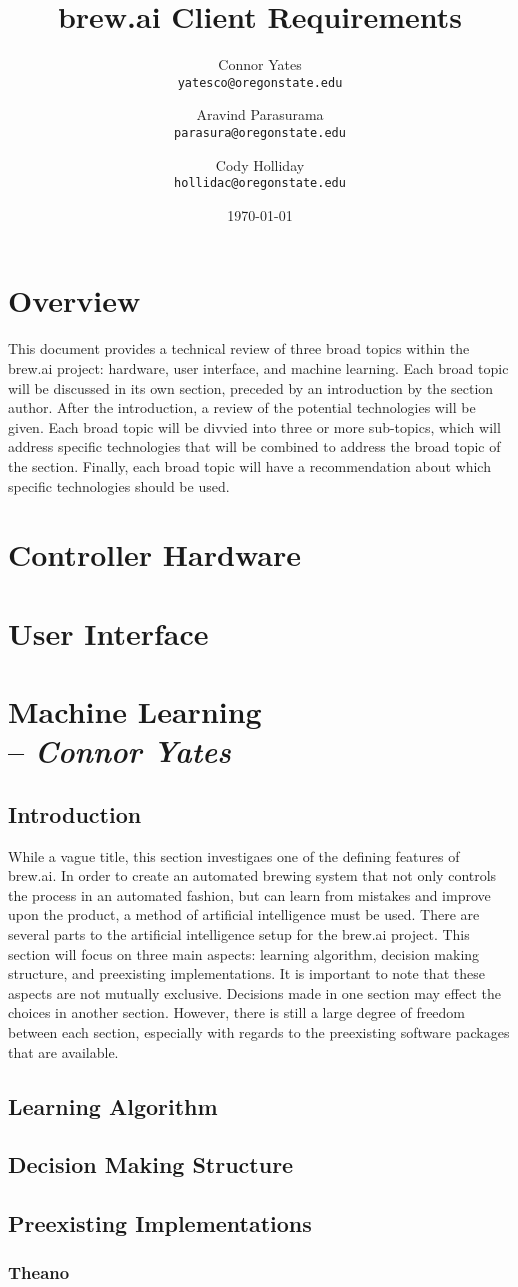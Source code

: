 \documentclass[draftclsnofoot,onecolumn,letterpaper,10pt]{IEEEtran}
\author{Connor Yates\\
\texttt{yatesco@oregonstate.edu\\}
\and
Aravind Parasurama\\
\texttt{parasura@oregonstate.edu\\}
\and
Cody Holliday\\
\texttt{hollidac@oregonstate.edu\\}}
\date{\today}
\title{brew.ai Client Requirements}
\begin{document}
\maketitle

\newpage
\tableofcontents
\newpage
\section{Overview}
This document provides a technical review of three broad topics within the brew.ai project: hardware, user interface, and machine learning.
Each broad topic will be discussed in its own section, preceded by an introduction by the section author.
After the introduction, a review of the potential technologies will be given.
Each broad topic will be divvied into three or more sub-topics, which will address specific technologies that will be combined to address the broad topic of the section.
Finally, each broad topic will have a recommendation about which specific technologies should be used.

\section{Controller Hardware}

\section{User Interface}

\section{Machine Learning \\ -- \textbf{\textit{Connor Yates}}}
\subsection{Introduction}
While a vague title, this section investigaes one of the defining features of brew.ai.
In order to create an automated brewing system that not only controls the process in an automated fashion, but can learn from mistakes and improve upon the product, a method of artificial intelligence must be used.
There are several parts to the artificial intelligence setup for the brew.ai project.
This section will focus on three main aspects: learning algorithm, decision making structure, and preexisting implementations.
It is important to note that these aspects are not mutually exclusive. 
Decisions made in one section may effect the choices in another section.
However, there is still a large degree of freedom between each section, especially with regards to the preexisting software packages that are available.

\subsection{Learning Algorithm}

\subsection{Decision Making Structure}

\subsection{Preexisting Implementations}
\subsubsection{Theano}
\end{document}

